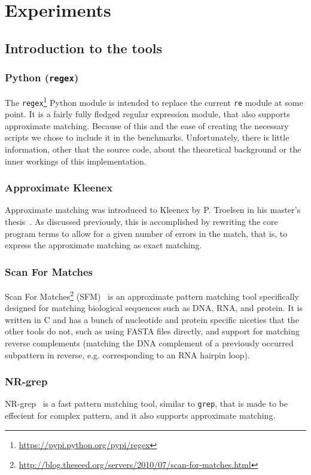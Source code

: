 \section{Experiments}

\subsection{Introduction to the tools}
\subsubsection{Python (\texttt{regex})}
The \texttt{regex}\footnote{\url{https://pypi.python.org/pypi/regex}} Python
module is intended to replace the current \texttt{re} module at some point. It
is a fairly fully fledged regular expression module, that also supports
approximate matching. Because of this and the ease of creating the necessary
scripts we chose to include it in the benchmarks. Unfortunately, there is
little information, other that the source code, about the theoretical
background or the inner workings of this implementation.

\subsubsection{Approximate Kleenex}
Approximate matching was introduced to Kleenex by P. Troelsen in his master's
thesis~\cite{troelsen2016approximate}. As discussed previously, this is
accomplished by rewriting the core program terms to allow for a given number of
errors in the match, that is, to express the approximate matching as exact
matching.

\subsubsection{Scan For Matches}
Scan For Matches\footnote{\url{http://blog.theseed.org/servers/2010/07/scan-for-matches.html}}
(SFM)~\cite{dsouza1997searching} is an approximate pattern matching tool
specifically designed for matching biological sequences such as DNA, RNA, and
protein. It is written in C and has a bunch of nucleotide and protein specific
niceties that the other tools do not, such as using FASTA files directly, and
support for matching reverse complements (matching the DNA complement of a
previously occurred subpattern in reverse, e.g. corresponding to an RNA hairpin
loop).

\subsubsection{NR-grep}
NR-grep~\cite{navarro2001nr} is a fast pattern matching tool, similar to
\texttt{grep}, that is made to be effecient for complex pattern, and it also
supports approximate matching.


